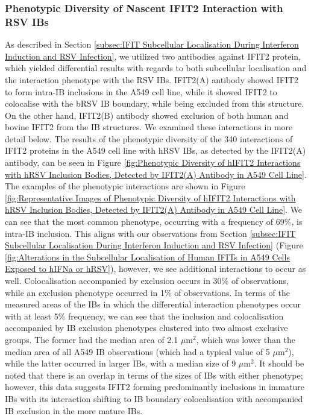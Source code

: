 \subsubsection{Phenotypic Diversity of Nascent IFIT2 Interaction with RSV IBs}
As described in Section \ref{subsec:IFIT Subcellular Localisation During Interferon Induction and RSV Infection}, we utilized two antibodies against IFIT2 protein, which yielded differential results with regards to both subcellular localisation and the interaction phenotype with the RSV IBs. IFIT2(A) antibody showed IFIT2 to form intra-IB inclusions in the A549 cell line, while it showed IFIT2 to colocalise with the bRSV IB boundary, while being excluded from this structure. On the other hand, IFIT2(B) antibody showed exclusion of both human and bovine IFIT2 from the IB structures. We examined these interactions in more detail below. The results of the phenotypic diversity of the 340 interactions of IFIT2 proteins in the A549 cell line with hRSV IBs, as detected by the IFIT2(A) antibody, can be seen in Figure \ref{fig:Phenotypic Diversity of hIFIT2 Interactions with hRSV Inclusion Bodies, Detected by IFIT2(A) Antibody in A549 Cell Line}. The examples of the phenotypic interactions are shown in Figure \ref{fig:Representative Images of Phenotypic Diversity of hIFIT2 Interactions with hRSV Inclusion Bodies, Detected by IFIT2(A) Antibody in A549 Cell Line}. We can see that the most common phenotype, occurring with a frequency of 69\%, is intra-IB inclusion. This aligns with our observations from Section \ref{subsec:IFIT Subcellular Localisation During Interferon Induction and RSV Infection} (Figure \ref{fig:Alterations in the Subcellular Localisation of Human IFITs in A549 Cells Exposed to hIFNa or hRSV}), however, we see additional interactions to occur as well. Colocalisation accompanied by exclusion occurs in 30\% of observations, while an exclusion phenotype occurred in 1\% of observations. In terms of the measured areas of the IBs in which the differential interaction phenotypes occur with at least 5\% frequency, we can see that the inclusion and colocalisation accompanied by IB exclusion phenotypes clustered into two almost exclusive groups. The former had the median area of 2.1 \(\mu \mbox{m}^2\), which was lower than the median area of all A549 IB observations (which had a typical value of 5 \(\mu \mbox{m}^2\)), while the latter occurred in larger IBs, with a median size of 9 \(\mu \mbox{m}^2\). It should be noted that there is an overlap in terms of the sizes of IBs with either phenotype; however, this data suggests IFIT2 forming predominantly inclusions in immature IBs with its interaction shifting to IB boundary colocalisation with accompanied IB exclusion in the more mature IBs.

